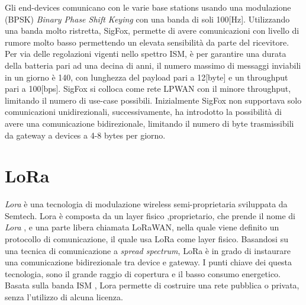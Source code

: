 Gli end-devices comunicano con le varie base stations usando una modulazione (BPSK)
\emph{Binary Phase Shift Keying} con una banda di soli 100[Hz]. Utilizzando una
banda molto ristretta, SigFox, permette di avere comunicazioni con livello di
rumore molto basso permettendo un elevata sensibilità da parte del
ricevitore. 
Per via delle regolazioni vigenti nello spettro ISM, è per garantire una durata
della batteria pari ad una decina di anni, il numero massimo di messaggi
inviabili in un giorno è 140, con lunghezza del payload pari a 12[byte] e un
throughput pari a 100[bps]. SigFox si colloca come rete LPWAN con il minore
throughput, limitando il numero di use-case possibili. Inizialmente SigFox non
supportava solo comunicazioni unidirezionali, successivamente, ha introdotto la
possibilità di avere una comunicazione bidirezionale, limitando il numero di
byte trasmissibili da gateway a devices a 4-8 bytes per giorno.

\section{LoRa}
\emph{Lora} è una tecnologia di modulazione wireless semi-proprietaria 
sviluppata da Semtech. Lora è composta da un layer fisico ,proprietario, che
prende il nome di \emph{Lora}\cite{LoRaCss101} , e una parte libera chiamata 
LoRaWAN\cite{LoRaWAN101}, nella quale viene definito un protocollo di comunicazione, 
il quale usa LoRa come layer fisico. 
Basandosi su una tecnica di comunicazione a \emph{spread spectrum}, LoRa è in
grado di instaurare una comunicazione bidirezionale tra device e gateway.
I punti chiave dei questa tecnologia, sono il grande raggio di copertura e il 
basso consumo energetico. 
Basata sulla banda ISM , Lora permette di costruire una rete pubblica o privata,
senza l'utilizzo di alcuna licenza.

